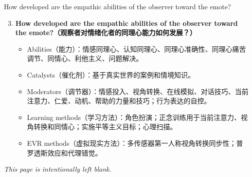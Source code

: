 \documentclass[aspectratio=169,xcolor=dvipsnames]{beamer}
\begin{document}
\begin{frame}{How developed are the empathic abilities of the observer toward the emote?}
    \begin{enumerate}
        \setcounter{enumi}{2}
        \item \textbf{How developed are the empathic abilities of the observer toward the emote?（观察者对情绪化者的同理心能力如何发展？）}
        \begin{itemize}
            \item Abilities（能力）：情感同理心、认知同理心、同理心准确性、同理心痛苦调节、同情心、利他主义、问题解决。
            \item Catalysts（催化剂）：基于真实世界的案例和情境知识。
            \item Moderators（调节器）：情感投入、视角转换、在线模拟、对话技巧、当前注意力、仁爱、动机、帮助的力量和技巧；行为表达的自控。
            \item Learning methods（学习方法）：角色扮演；正念训练用于当前注意力、视角转换和同情心；实施平等主义目标；心理扫描。
            \item EVR methods（虚拟现实方法）：多传感器第一人称视角转换同步性；普罗透斯效应和代理错觉。
        \end{itemize}
    \end{enumerate}
\end{frame}



    

\begin{frame}
    \begin{center}
        \textit{This page is intentionally left blank.}
    \end{center}
\end{frame}
\end{document}

